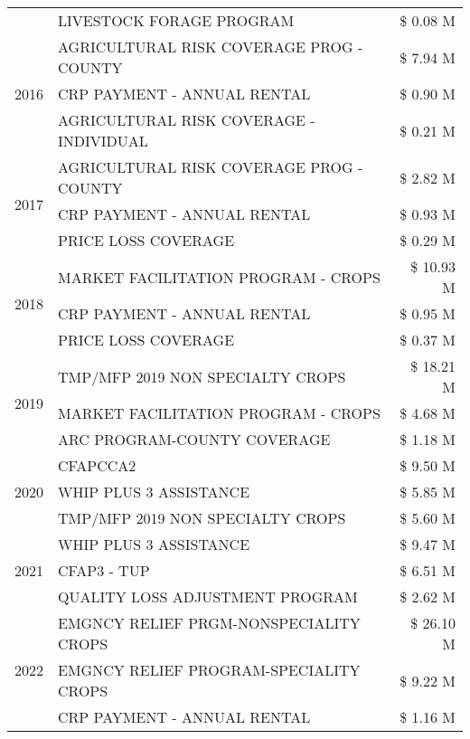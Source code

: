 \begin{tabular}{llr}
 & LIVESTOCK FORAGE PROGRAM & \$ 0.08 M \\
\cline{1-3}
\multirow[t]{3}{*}{2016} & AGRICULTURAL RISK COVERAGE PROG - COUNTY & \$ 7.94 M \\
 & CRP PAYMENT - ANNUAL RENTAL & \$ 0.90 M \\
 & AGRICULTURAL RISK COVERAGE - INDIVIDUAL & \$ 0.21 M \\
\cline{1-3}
\multirow[t]{3}{*}{2017} & AGRICULTURAL RISK COVERAGE PROG - COUNTY & \$ 2.82 M \\
 & CRP PAYMENT - ANNUAL RENTAL & \$ 0.93 M \\
 & PRICE LOSS COVERAGE & \$ 0.29 M \\
\cline{1-3}
\multirow[t]{3}{*}{2018} & MARKET FACILITATION PROGRAM - CROPS & \$ 10.93 M \\
 & CRP PAYMENT - ANNUAL RENTAL & \$ 0.95 M \\
 & PRICE LOSS COVERAGE & \$ 0.37 M \\
\cline{1-3}
\multirow[t]{3}{*}{2019} & TMP/MFP 2019 NON SPECIALTY CROPS & \$ 18.21 M \\
 & MARKET FACILITATION PROGRAM - CROPS & \$ 4.68 M \\
 & ARC PROGRAM-COUNTY COVERAGE & \$ 1.18 M \\
\cline{1-3}
\multirow[t]{3}{*}{2020} & CFAPCCA2 & \$ 9.50 M \\
 & WHIP PLUS 3 ASSISTANCE & \$ 5.85 M \\
 & TMP/MFP 2019 NON SPECIALTY CROPS & \$ 5.60 M \\
\cline{1-3}
\multirow[t]{3}{*}{2021} & WHIP PLUS 3 ASSISTANCE & \$ 9.47 M \\
 & CFAP3 - TUP & \$ 6.51 M \\
 & QUALITY LOSS ADJUSTMENT PROGRAM & \$ 2.62 M \\
\cline{1-3}
\multirow[t]{3}{*}{2022} & EMGNCY RELIEF PRGM-NONSPECIALITY CROPS & \$ 26.10 M \\
 & EMGNCY RELIEF PROGRAM-SPECIALITY CROPS & \$ 9.22 M \\
 & CRP PAYMENT - ANNUAL RENTAL & \$ 1.16 M \\
\cline{1-3}
\bottomrule
\end{tabular}
